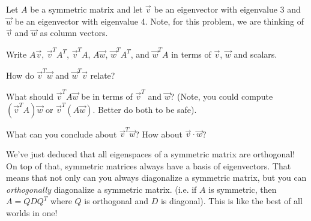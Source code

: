 \documentclass{problemset}
\begin{document}
	\question
	Let $A$ be a symmetric matrix and let $\vec v$ be an eigenvector with eigenvalue
	3 and $\vec w$ be an eigenvector with eigenvalue 4.  Note, for this problem,
	we are thinking of $\vec v$ and $\vec w$ as column vectors.
	\begin{parts}
		\item Write $A\vec v$, $\vec v^TA^T$, $\vec v^TA$, $A\vec w$, $\vec w^TA^T$, 
		and $\vec w^TA$ in terms of $\vec v$, $\vec w$ and scalars.
		\item How do $\vec v^T\vec w$ and $\vec w^T\vec v$ relate?
		\item What should $\vec v^TA\vec w$ be in terms of $\vec v^T$ and
			$\vec w$? (Note, you could compute $(\vec v^TA)\vec w$
			or $\vec v^T(A\vec w)$.  Better do both to be safe).
		\item What can you conclude about $\vec v^T\vec w$?  How about
			$\vec v\cdot \vec w$?
	\end{parts}

	We've just deduced that all eigenspaces of a symmetric matrix are orthogonal! On
	top of that, symmetric matrices always have a basis of eigenvectors.  That means
	that not only can you always diagonalize a symmetric matrix, but you can 
	\emph{orthogonally} diagonalize a symmetric matrix. (i.e. if $A$ is symmetric,
	then $A=QDQ^T$ where $Q$ is orthogonal and $D$ is diagonal).  This is like the 
	best of all worlds in one!
\end{document}
